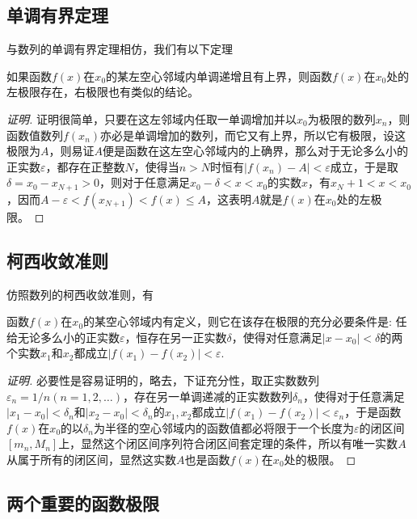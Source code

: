 \subsection{单调有界定理}
\label{sec:theorem-of-monotone-and-bounded-of-function-limit}

与数列的单调有界定理相仿，我们有以下定理
\begin{theorem}
  如果函数$f(x)$在$x_0$的某左空心邻域内单调递增且有上界，则函数$f(x)$在$x_0$处的左极限存在，右极限也有类似的结论。
\end{theorem}

\begin{proof}[证明]
证明很简单，只要在这左邻域内任取一单调增加并以$x_0$为极限的数列$x_n$，则函数值数列$f(x_n)$亦必是单调增加的数列，而它又有上界，所以它有极限，设这极限为$A$，则易证$A$便是函数在这左空心邻域内的上确界，那么对于无论多么小的正实数$\varepsilon$，都存在正整数$N$，使得当$n>N$时恒有$|f(x_n)-A|<\varepsilon$成立，于是取$\delta = x_0-x_{N+1}>0$，则对于任意满足$x_0-\delta<x<x_0$的实数$x$，有$x_N+1<x<x_0$，因而$A-\varepsilon<f(x_{N+1})<f(x) \leqslant A$，这表明$A$就是$f(x)$在$x_0$处的左极限。
\end{proof}

\subsection{柯西收敛准则}
\label{sec:cauchy-convergence-rule-of-function-limit}

仿照数列的柯西收敛准则，有
\begin{theorem}
  函数$f(x)$在$x_0$的某空心邻域内有定义，则它在该存在极限的充分必要条件是: 任给无论多么小的正实数$\varepsilon$，恒存在另一正实数$\delta$，使得对任意满足$|x-x_0|<\delta$的两个实数$x_1$和$x_2$都成立$|f(x_1)-f(x_2)|<\varepsilon$.
\end{theorem}

\begin{proof}[证明]
  必要性是容易证明的，略去，下证充分性，取正实数数列$\varepsilon_n=1/n(n=1,2,\ldots)$，存在另一单调递减的正实数数列$\delta_n$，使得对于任意满足$|x_1-x_0|<\delta_n$和$|x_2-x_0|<\delta_n$的$x_1,x_2$都成立$|f(x_1)-f(x_2)|<\varepsilon_n$，于是函数$f(x)$在$x_0$的以$\delta_n$为半径的空心邻域内的函数值都必将限于一个长度为$\varepsilon$的闭区间$[m_n,M_n]$上，显然这个闭区间序列符合闭区间套定理的条件，所以有唯一实数$A$从属于所有的闭区间，显然这实数$A$也是函数$f(x)$在$x_0$处的极限。
\end{proof}


\subsection{两个重要的函数极限}
\label{sec:two-important-function-limit}

